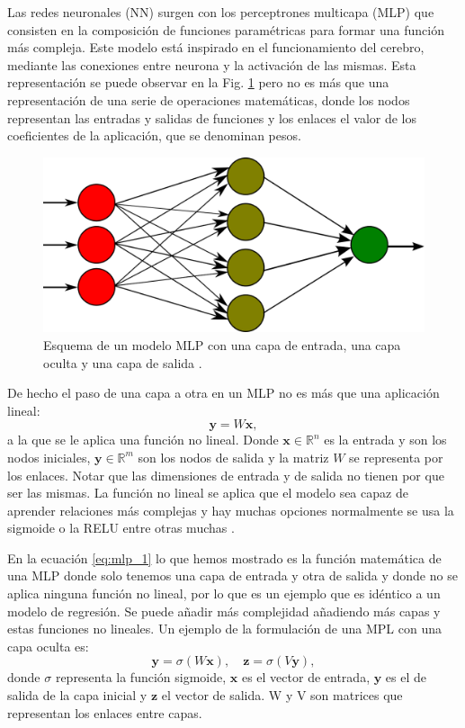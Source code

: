 \documentclass[a4paper,12pt,twoside,titlepage]{article}
\begin{document}
Las redes neuronales (NN) surgen con los perceptrones multicapa (MLP) que consisten en la composición de funciones paramétricas para formar una función más compleja. Este modelo está inspirado en el funcionamiento del cerebro, mediante las conexiones entre neurona y la activación de las mismas. Esta representación se puede observar en la Fig. \ref{fig:mlp} pero no es más que una representación de una serie de operaciones matemáticas, donde los nodos representan las entradas y salidas de funciones y los enlaces el valor de los coeficientes de la aplicación, que se denominan pesos. 
\begin{figure}[h!]
  \centering
  \includegraphics[scale=0.29]{MultiLayerPerceptron.png}
  \caption{Esquema de un modelo MLP con una capa de entrada, una capa oculta y una capa de salida \cite{mlp}.}
  \label{fig:mlp}
\end{figure}

De hecho el paso de una capa a otra en un MLP no es más que una aplicación lineal:
\begin{equation}
  \label{eq:mlp_1}
  \mathbf{y} = W\mathbf{x},
\end{equation}
a la que se le aplica una función no lineal. Donde $\mathbf{x} \in \mathbb{R}^n $ es la entrada y son los nodos iniciales, $\mathbf{y} \in \mathbb{R}^m$ son los nodos de salida y la matriz $W$ se representa por los enlaces. Notar que las dimensiones de entrada y de salida no tienen por que ser las mismas. La función no lineal se aplica que el modelo sea capaz de aprender relaciones más complejas y hay muchas opciones normalmente se usa la sigmoide o la RELU entre otras muchas \cite{dl_book}.

En la ecuación \ref{eq:mlp_1} lo que hemos mostrado es la función matemática de una MLP donde solo tenemos una capa de entrada y otra de salida y donde no se aplica ninguna función no lineal, por lo que es un ejemplo que es idéntico a un modelo de regresión. Se puede añadir más complejidad añadiendo más capas y estas funciones no lineales. Un ejemplo de la formulación de una MPL con una capa oculta es:
\begin{equation}
  \mathbf{y} = \sigma(W\mathbf{x}), \quad \mathbf{z} = \sigma(V\mathbf{y}),
\end{equation}
donde $\sigma$ representa la función sigmoide, $\mathbf{x}$ es el vector de entrada, $\mathbf{y}$ es el de salida de la capa inicial y $\mathbf{z}$ el vector de salida. W y V son matrices que representan los enlaces entre capas.
\end{document}
